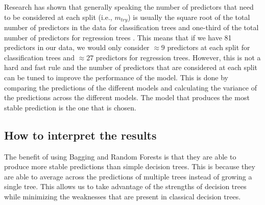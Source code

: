 Research has shown that generally speaking the number of predictors that need to be considered at each split (i.e., $m_{try}$) is usually the square root of the total number of predictors in the data for classification trees and one-third of the total number of predictors for regression trees \citep{breimanRandomForests2001,sandriBiasCorrectionAlgorithm2008,hastieElementsStatisticalLearning2009,
janitzaOverestimationRandomForests2018,boehmkeHandsOnMachineLearning2019,jamesIntroductionStatisticalLearning2021}. This means that if we have 81 predictors in our data, we would only consider $\approx 9$ predictors at each split for classification trees and $\approx 27$ predictors for regression trees. However, this is not a hard and fast rule and the number of predictors that are considered at each split can be tuned to improve the performance of the model. This is done by comparing the predictions of the different models and calculating the variance of the predictions across the different models. The model that produces the most stable prediction is the one that is chosen.

\subsection{How to interpret the results} \label{sec:random_forests_interpret}

The benefit of using Bagging and Random Forests is that they are able to produce more stable predictions than simple decision trees. This is because they are able to average across the predictions of multiple trees instead of growing a single tree. This allows us to take advantage of the strengths of decision trees while minimizing the weaknesses that are present in classical decision trees. 

